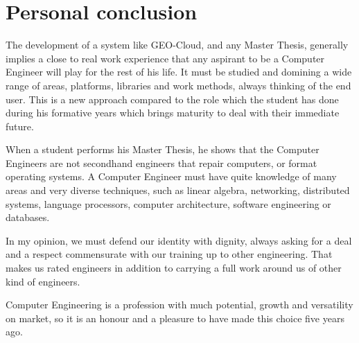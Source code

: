 \section{Personal conclusion}

The development of a system like GEO-Cloud, and any Master Thesis, generally implies a close to real work experience that any aspirant to be a Computer
Engineer will play for the rest of his life. It must be studied and domining a wide range of areas, platforms, libraries and work methods, always
thinking of the end user. This is a new approach
compared to the role which the student has done during his formative years which
brings maturity to deal with their immediate future.

When a student performs his Master Thesis, he shows that the Computer Engineers
are not secondhand engineers that repair computers, or format operating
systems. A Computer Engineer must have quite knowledge of many areas
and very diverse techniques, such as linear algebra, networking, distributed
systems, language processors,  computer architecture, software engineering or
databases. 

In my opinion, we must defend our identity with dignity, always asking for a deal and a respect commensurate with
our training up to other engineering. That makes us rated engineers  in
addition to carrying a full work around us of other kind of engineers. 

Computer Engineering is a profession with much potential, growth  and versatility on market, so it is an honour and a pleasure to have
made this choice five years ago.
